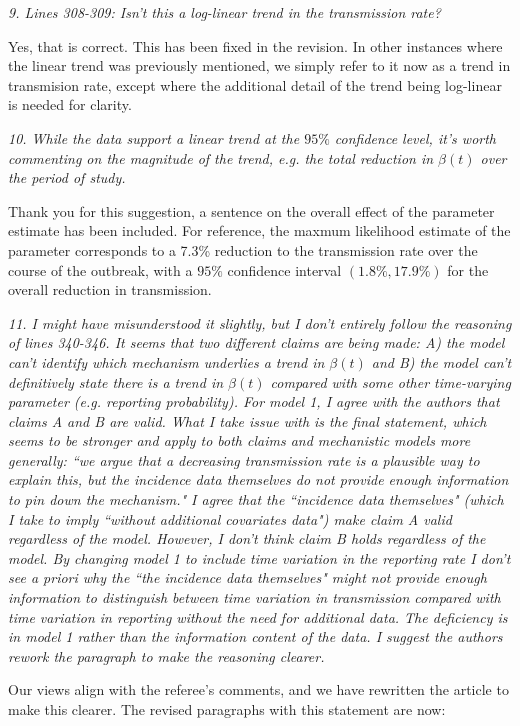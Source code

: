 \documentclass[11pt]{article}
\newcommand\report[1]{{\color{mygreen} \vspace{1mm}\hspace{0.25in}\parbox{6in}{\em #1}}}
\begin{document}
\report{9.
  Lines 308-309: Isn't this a log-linear trend in the transmission rate?
}

Yes, that is correct. This has been fixed in the revision. In other instances where the linear trend was previously mentioned, we simply refer to it now as a trend in transmision rate, except where the additional detail of the trend being log-linear is needed for clarity.

\report{10.
  While the data support a linear trend at the $95\%$ confidence level, it's worth commenting on the magnitude of the trend, e.g. the total reduction in $\beta(t)$ over the period of study.
}

Thank you for this suggestion, a sentence on the overall effect of the parameter estimate has been included.
For reference, the maxmum likelihood estimate of the parameter corresponds to a 7.3\% reduction to the transmission rate over the course of the outbreak, with a $95\%$ confidence interval $(1.8\%, 17.9\%)$ for the overall reduction in transmission.

\report{11.
  I might have misunderstood it slightly, but I don't entirely follow the reasoning of lines 340-346. It seems that two different claims are being made: A) the model can’t identify which mechanism underlies a trend in $\beta(t)$ and B) the model can't definitively state there is a trend in $\beta(t)$ compared with some other time-varying parameter (e.g. reporting probability). For model 1, I agree with the authors that claims A and B are valid. What I take issue with is the final statement, which seems to be stronger and apply to both claims and mechanistic models more generally: ``we argue that a decreasing transmission rate is a plausible way to explain this, but the incidence data themselves do not provide enough information to pin down the mechanism." I agree that the ``incidence data themselves" (which I take to imply ``without additional covariates data") make claim A valid regardless of the model. However, I don’t think claim B holds regardless of the model. By changing model 1 to include time variation in the reporting rate I don't see \emph{a priori} why the ``the incidence data themselves" might not provide enough information to distinguish between time variation in transmission compared with time variation in reporting without the need for additional data. The deficiency is in model 1 rather than the information content of the data. I suggest the authors rework the paragraph to make the reasoning clearer.
}

Our views align with the referee's comments, and we have rewritten the article to make this clearer. The revised paragraphs with this statement are now:
\end{document}
